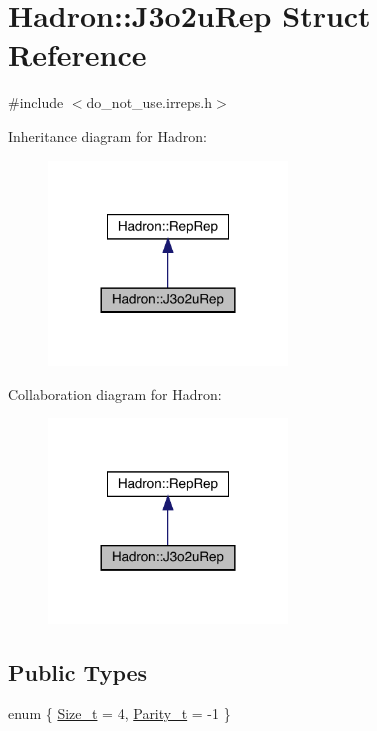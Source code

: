 \hypertarget{structHadron_1_1J3o2uRep}{}\section{Hadron\+:\+:J3o2u\+Rep Struct Reference}
\label{structHadron_1_1J3o2uRep}


{\ttfamily \#include $<$do\+\_\+not\+\_\+use.\+irreps.\+h$>$}



Inheritance diagram for Hadron\+:\nopagebreak
\begin{figure}[H]
\begin{center}
\leavevmode
\includegraphics[width=180pt]{d5/dd1/structHadron_1_1J3o2uRep__inherit__graph}
\end{center}
\end{figure}


Collaboration diagram for Hadron\+:\nopagebreak
\begin{figure}[H]
\begin{center}
\leavevmode
\includegraphics[width=180pt]{d7/d18/structHadron_1_1J3o2uRep__coll__graph}
\end{center}
\end{figure}
\subsection*{Public Types}
\begin{DoxyCompactItemize}
\item 
enum \{ \mbox{\hyperlink{structHadron_1_1J3o2uRep_a03f1164cdb895991ec3c066685facf11a7a6605741cf45011394c0eacd4550bec}{Size\+\_\+t}} = 4, 
\mbox{\hyperlink{structHadron_1_1J3o2uRep_a03f1164cdb895991ec3c066685facf11ab7ce380e821a6552a7488c8bdd53e65e}{Parity\+\_\+t}} = -\/1
 \}
\end{DoxyCompactItemize}
